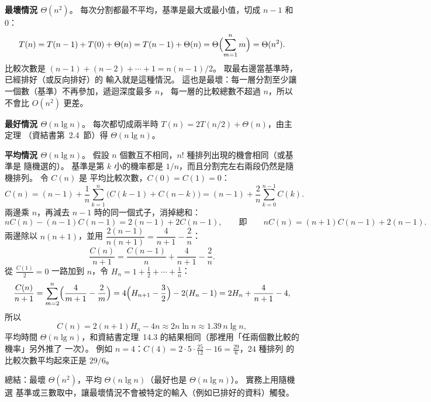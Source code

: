 \begin{pastsoln}
\textbf{最壞情況 $\Theta(n^2)$}。 每次分割都最不平均，基準是最大或最小值，切成 $n - 1$ 和 $0$：
\[
T(n) = T(n - 1) + T(0) + \Theta(n) = T(n-1) + \Theta(n)
= \Theta\Bigl(\sum_{m=1}^{n} m\Bigr) = \Theta(n^2).
\]
比較次數是 $(n-1) + (n-2) + \cdots + 1 = n(n-1)/2$。 取最右邊當基準時，已經排好（或反向排好）的
輸入就是這種情況。 這也是最壞：每一層分割至少讓一個數（基準）不再參加，遞迴深度最多 $n$，
每一層的比較總數不超過 $n$，所以不會比 $O(n^2)$ 更差。

\textbf{最好情況 $\Theta(n \lg n)$}。 每次都切成兩半時 $T(n) = 2T(n/2) + \Theta(n)$，由主定理
（資結書第~2.4~節）得 $\Theta(n \lg n)$。

\textbf{平均情況 $\Theta(n \lg n)$}。 假設 $n$ 個數互不相同，$n!$ 種排列出現的機會相同（或基準是
隨機選的）。 基準是第 $k$ 小的機率都是 $1/n$，而且分割完左右兩段仍然是隨機排列。 令 $C(n)$ 是
平均比較次數，$C(0) = C(1) = 0$：
\[
C(n) = (n - 1) + \frac{1}{n} \sum_{k=1}^{n} \bigl(C(k-1) + C(n-k)\bigr)
     = (n - 1) + \frac{2}{n} \sum_{k=0}^{n-1} C(k).
\]
兩邊乘 $n$，再減去 $n - 1$ 時的同一個式子，消掉總和：
\[
nC(n) - (n-1)C(n-1) = 2(n-1) + 2C(n-1),
\qquad\text{即}\qquad
nC(n) = (n+1)C(n-1) + 2(n-1).
\]
兩邊除以 $n(n+1)$，並用 $\dfrac{2(n-1)}{n(n+1)} = \dfrac{4}{n+1} - \dfrac{2}{n}$：
\[
\frac{C(n)}{n+1} = \frac{C(n-1)}{n} + \frac{4}{n+1} - \frac{2}{n}.
\]
從 $\frac{C(1)}{2} = 0$ 一路加到 $n$，令 $H_n = 1 + \frac12 + \cdots + \frac1n$：
\[
\frac{C(n)}{n+1} = \sum_{m=2}^{n}\Bigl(\frac{4}{m+1} - \frac{2}{m}\Bigr)
= 4\Bigl(H_{n+1} - \frac32\Bigr) - 2(H_n - 1)
= 2H_n + \frac{4}{n+1} - 4,
\]
所以
\[
C(n) = 2(n+1)H_n - 4n \approx 2n \ln n \approx 1.39\, n \lg n,
\]
平均時間 $\Theta(n \lg n)$，和資結書定理~14.3 的結果相同（那裡用「任兩個數比較的機率」另外推了
一次）。 例如 $n = 4$：$C(4) = 2 \cdot 5 \cdot \frac{25}{12} - 16 = \frac{29}{6}$，$24$ 種排列
的比較次數平均起來正是 $29/6$。

總結：最壞 $\Theta(n^2)$，平均 $\Theta(n \lg n)$（最好也是 $\Theta(n \lg n)$）。 實務上用隨機選
基準或三數取中，讓最壞情況不會被特定的輸入（例如已排好的資料）觸發。
\end{pastsoln}
